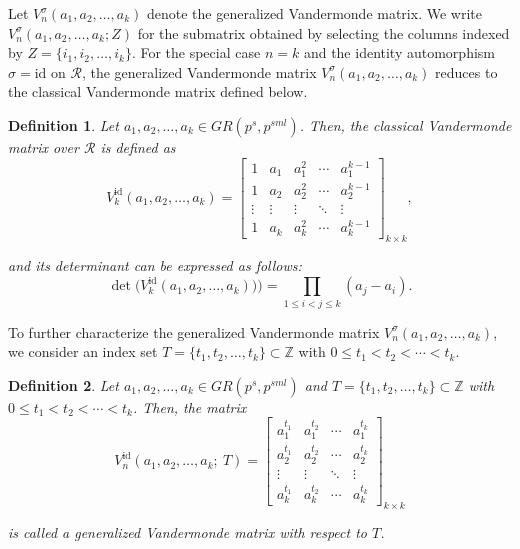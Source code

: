 \documentclass[11pt]{article}
\newtheorem{definition}{Definition}
\begin{document}
Let $V^\sigma_n(a_1, a_2, \dots, a_k)$ denote the generalized Vandermonde matrix.  
We write $V^\sigma_n(a_1, a_2, \dots, a_k; Z)$ for the submatrix obtained by selecting the columns indexed by $Z = \{i_1, i_2, \dots, i_k\}$.  
For the special case \( n = k \) and the identity automorphism \( \sigma = \mathrm{id} \) on \( \mathcal{R} \),  
the generalized Vandermonde matrix \( V^\sigma_n(a_1, a_2, \dots, a_k) \) reduces to the classical Vandermonde matrix defined below.

\begin{definition}
Let \( a_1,a_2,\dots,a_k \in GR(p^{s}, p^{sml}) \). Then, the classical Vandermonde matrix over \( \mathcal{R} \) is defined as
\[
V^{\mathrm{id}}_k(a_1, a_2, \dots, a_k) =
\begin{bmatrix}
1 & a_1 & a_1^2 & \cdots & a_1^{k-1} \\
1 & a_2 & a_2^2 & \cdots & a_2^{k-1} \\
\vdots & \vdots & \vdots & \ddots & \vdots \\
1 & a_k & a_k^2 & \cdots & a_k^{k-1}
\end{bmatrix}_{k\times k},
\]

and its determinant can be expressed as follows:
\[\det\bigl(V^{\mathrm{id}}_k(a_1, a_2, \dots, a_k))\bigr) = \prod_{1\leq i < j \leq k} (a_j - a_i).
	\]
\end{definition}

To further characterize the generalized Vandermonde matrix \( V^\sigma_n(a_1, a_2, \dots, a_k) \), we consider an index set 
\( T = \{t_{1}, t_{2}, \dots, t_{k}\} \subset \mathbb{Z} \) with 
\( 0 \leq t_{1} < t_{2} < \cdots < t_{k} \).

\begin{definition}
Let \( a_1,a_2,\dots,a_k \in GR(p^{s}, p^{sml}) \) and 
\( T = \{t_{1}, t_{2}, \ldots, t_{k}\} \subset \mathbb{Z} \) with 
\( 0 \leq t_{1} < t_{2} < \cdots < t_{k} \). 
Then, the matrix
\[
V^{\mathrm{id}}_n(a_1, a_2, \dots, a_k;~ T) =
\begin{bmatrix}
a_{1}^{t_{1}} & a_{1}^{t_{2}} & \cdots & a_{1}^{t_{k}} \\
a_{2}^{t_{1}} & a_{2}^{t_{2}} & \cdots & a_{2}^{t_{k}} \\
\vdots & \vdots & \ddots & \vdots \\
a_{k}^{t_{1}} & a_{k}^{t_{2}} & \cdots & a_{k}^{t_{k}}
\end{bmatrix}_{k \times k}
\]

is called a generalized Vandermonde matrix with respect to \( T \).
\end{definition}
\end{document}
